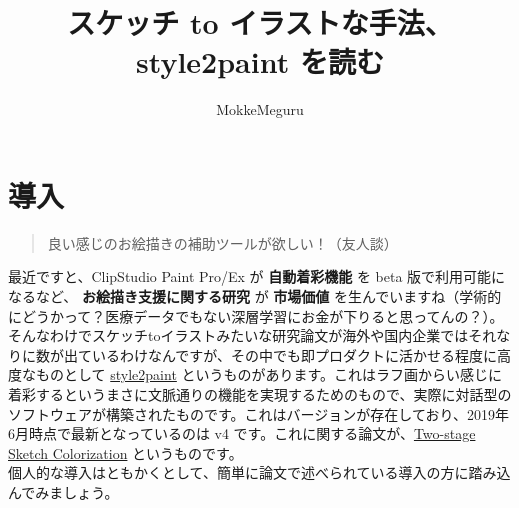 \documentclass[a4paper, dvipdfmx, 10pt]{article}
\author{MokkeMeguru}
\date{}
\title{スケッチ to イラストな手法、style2paint を読む}
\begin{document}
\maketitle
\section{導入}
\label{sec:org07b1c8e}
\begin{quote}
良い感じのお絵描きの補助ツールが欲しい！（友人談）\\
\end{quote}

最近ですと、ClipStudio Paint Pro/Ex が \textbf{自動着彩機能} を beta 版で利用可能になるなど、 \textbf{お絵描き支援に関する研究} が \textbf{市場価値} を生んでいますね（学術的にどうかって？医療データでもない深層学習にお金が下りると思ってんの？）。\\

そんなわけでスケッチtoイラストみたいな研究論文が海外や国内企業ではそれなりに数が出ているわけなんですが、その中でも即プロダクトに活かせる程度に高度なものとして \href{https://github.com/lllyasviel/style2paints}{style2paint} というものがあります。これはラフ画からい感じに着彩するというまさに文脈通りの機能を実現するためのもので、実際に対話型のソフトウェアが構築されたものです。これはバージョンが存在しており、2019年6月時点で最新となっているのは v4 です。これに関する論文が、\href{https://github.com/lllyasviel/style2paints/blob/master/papers/sa.pdf}{Two-stage Sketch Colorization} というものです。\\

個人的な導入はともかくとして、簡単に論文で述べられている導入の方に踏み込んでみましょう。\\
\end{document}
